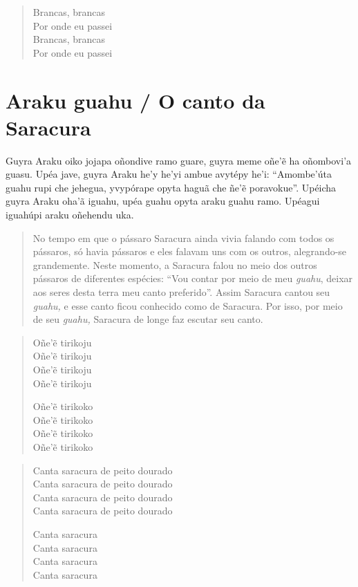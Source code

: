 \begin{itemize}
\begin{verse}
Brancas, brancas\\
Por onde eu passei\\
Brancas, brancas\\
Por onde eu passei
\end{verse}

\chapter{Araku guahu / O canto da Saracura}

Guyra Araku oiko jojapa oñondive ramo guare, guyra meme oñe'ẽ ha
oñombovi'a guasu. Upéa jave, guyra Araku he'y he'yi ambue avytépy he'i:
``Amombe'úta guahu rupi che jehegua, yvypórape opyta haguã che ñe'ẽ
poravokue''. Upéicha guyra Araku oha'ã iguahu, upéa guahu opyta araku
guahu ramo. Upéagui iguahúpi araku oñehendu uka.

\begin{quote}
No tempo em que o pássaro Saracura ainda vivia falando com todos os
pássaros, só havia pássaros e eles falavam uns com os outros,
alegrando-se grandemente. Neste momento, a Saracura falou no meio dos
outros pássaros de diferentes espécies: ``Vou contar por meio de meu
\emph{guahu}, deixar aos seres desta terra meu canto preferido''. Assim
Saracura cantou seu \emph{guahu,} e esse canto ficou conhecido como de
Saracura. Por isso, por meio de seu \emph{guahu,} Saracura de longe faz
escutar seu canto.
\end{quote}

\begin{verse}
Oñe'ẽ tirikoju\\
Oñe'ẽ tirikoju\\
Oñe'ẽ tirikoju\\
Oñe'ẽ tirikoju

Oñe'ẽ tirikoko\\
Oñe'ẽ tirikoko\\
Oñe'ẽ tirikoko\\
Oñe'ẽ tirikoko
\end{verse}

\begin{verse}
Canta saracura de peito dourado\\
Canta saracura de peito dourado\\
Canta saracura de peito dourado\\
Canta saracura de peito dourado

Canta saracura\\
Canta saracura\\
Canta saracura\\
Canta saracura
\end{verse}


\end{itemize}

